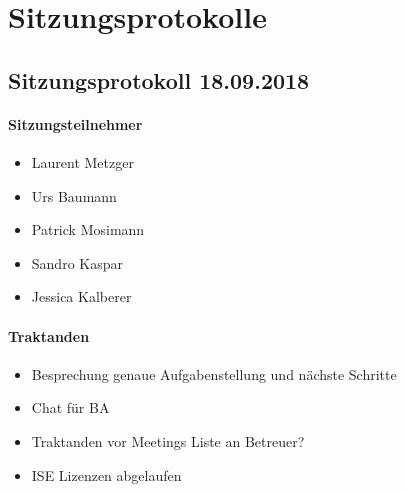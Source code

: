\section{Sitzungsprotokolle}

\subsection{Sitzungsprotokoll 18.09.2018}

\paragraph{Sitzungsteilnehmer}
\begin{itemize}	
	\item Laurent Metzger 
	\item Urs Baumann 
	\item Patrick Mosimann
	\item Sandro Kaspar
	\item Jessica Kalberer
\end{itemize}

\paragraph{Traktanden}
\begin{itemize}
	\item Besprechung genaue Aufgabenstellung und nächste Schritte
	\item Chat für BA
	\item Traktanden vor Meetings Liste an Betreuer? 
	\item ISE Lizenzen abgelaufen
\end{itemize}

